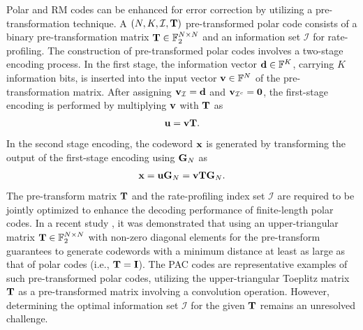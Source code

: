 \documentclass[conference]{IEEEtran}
\begin{document}
Polar and RM codes can be enhanced for error correction by utilizing a pre-transformation technique. A $(N,K,\mathcal{I},{\bf T})$ pre-transformed polar code consists of a binary pre-transformation matrix ${\bf T}\in \mathbb{F}_2^{N\times N}$ and an information set $\mathcal{I}$ for rate-profiling.  The construction of pre-transformed polar codes involves a two-stage encoding process. In the first stage, the information vector ${\bf d}\in \mathbb{F}^K$, carrying $K$ information bits, is inserted into the input vector ${\bf v}\in \mathbb{F}^N$ of the pre-transformation matrix. After assigning ${\bf v}_{\mathcal{I}}={\bf d}$ and ${\bf v}_{\mathcal{I}^c}={\bf 0}$, the first-stage encoding is performed by multiplying ${\bf v}$ with ${\bf T}$ as 
\begin{align}
	{\bf u}={\bf v}{\bf T}.
\end{align}
In the second stage encoding, the codeword ${\bf x}$ is generated by transforming the output of the first-stage encoding using ${\bf G}_N$ as 
\begin{align}
	{\bf x}={\bf u}{\bf G}_N={\bf v}{\bf T}{\bf G}_N.
\end{align}
The pre-transform matrix ${\bf T}$ and the rate-profiling index set $\mathcal{I}$ are required to be jointly optimized to enhance the decoding performance of finite-length polar codes. In a recent study \cite{li-pretransformed}, it was demonstrated that using an upper-triangular matrix ${\bf T}\in \mathbb{F}_2^{N\times N}$ with non-zero diagonal elements for the pre-transform guarantees to generate codewords with a minimum distance at least as large as that of polar codes (i.e., ${\bf T} = {\bf I}$). The PAC codes are representative examples of such pre-transformed polar codes, utilizing the upper-triangular Toeplitz matrix ${\bf T}$ as a pre-transformed matrix involving a convolution operation. However, determining the optimal information set $\mathcal{I}$ for the given ${\bf T}$ remains an unresolved challenge. 

\end{document}
